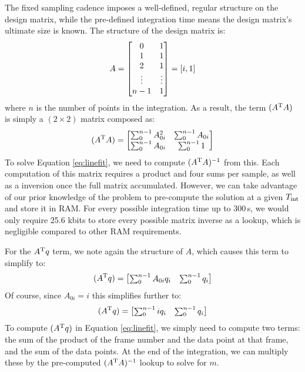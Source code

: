 \documentclass{ws-jai}
\begin{document}
The fixed sampling cadence imposes a well-defined, regular structure on the
design matrix, while the pre-defined integration time means the design
matrix's ultimate size is known.  The structure of the design matrix
is:
%
\begin{equation}
  A = \begin{bmatrix} 0 & 1 \\
    1 & 1 \\
    2 & 1 \\
    \vdots & \vdots \\
    n-1 & 1
  \end{bmatrix} = [i,1] \\
\end{equation}
%
where $n$ is the number of points in the integration.  As a result,
the term $(A^{\rm T} A)$ is simply a $(2 \times 2)$ matrix composed
as:
%
\begin{equation}
 (A^{\rm T} A) = \begin{bmatrix} \sum_{0}^{n-1} A_{0i}^{2} &
    \sum_{0}^{n-1} A_{0i} \\
    \sum_{0}^{n-1} A_{0i} & \sum_{0}^{n-1} 1 \end{bmatrix}
\end{equation}
%
To solve Equation \ref{eq:linefit}, we need to compute
$(A^{\rm T} A)^{-1}$ from this.  Each computation of this matrix
requires a product and four sums per sample, as well as a inversion
once the full matrix accumulated.  However, we can take advantage of
our prior knowledge of the problem to pre-compute the solution at a
given $T_{\rm int}$ and store it in RAM. For every possible
integration time up to $300 \,$s, we would only require 25.6 kbits to
store every possible matrix inverse as a lookup, which is negligible
compared to other RAM requirements.

For the $A^{\rm T} q$ term, we note again the structure of $A$, which
causes this term to simplify to:
%
\begin{equation}
 (A^{\rm T} q) = \begin{bmatrix} \sum_{0}^{n-1} A_{0i} q_{i} &
    \sum_{0}^{n-1} q_{i} \end{bmatrix}
\end{equation}
%
Of course, since $A_{0i} = i$ this simplifies further to:
%
\begin{equation}
 (A^{\rm T} q) = \begin{bmatrix} \sum_{0}^{n-1} i q_{i} &
    \sum_{0}^{n-1} q_{i} \end{bmatrix}
\end{equation}
%
To compute $ (A^{\rm T} q)$ in Equation \ref{eq:linefit}, we simply
need to compute two terms: the sum of the product of the frame number
and the data point at that frame, and the sum of the data points.  At
the end of the integration, we can multiply these by the pre-computed
$(A^{\rm T} A)^{-1}$ lookup to solve for $m$.
\end{document}
